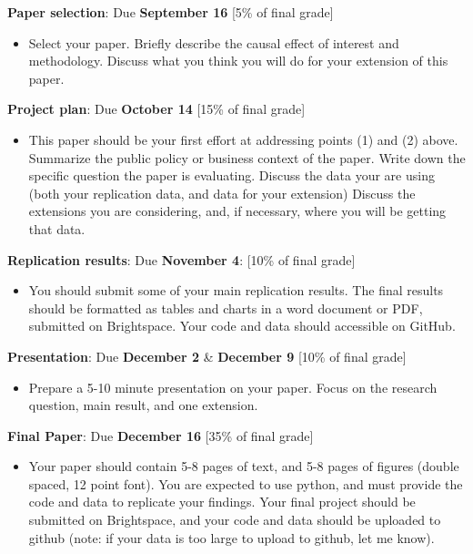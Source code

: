 \documentclass[handout, 8pt]{beamer}
\begin{document}
\begin{frame}{}

\textbf{Paper selection}: Due \textbf{September 16} [5\% of final grade]
\begin{itemize}
\item Select your paper. Briefly describe the causal effect of interest and methodology. Discuss what you think you will do for your extension of this paper. 
\end{itemize}

\textbf{Project plan}: Due \textbf{October 14} [15\% of final grade] 
\begin{itemize}
\item This paper should be your first effort at addressing points (1) and (2) above. 
Summarize the public policy or business context of the paper. 
Write down the specific question the paper is evaluating.
Discuss the data your are using (both your replication data, and data for your extension)
Discuss the extensions you are considering, and, if necessary, where you will be getting that data. 
\end{itemize} 

\textbf{Replication results}: Due \textbf{November 4}: [10\% of final grade]
\begin{itemize}
\item You should submit some of your main replication results. The final results should be formatted as tables and charts in a word document or PDF, submitted on Brightspace. Your code and data should accessible on GitHub.
\end{itemize}

\textbf{Presentation}: Due \textbf{December 2} \& \textbf{December 9} [10\% of final grade]
\begin{itemize}
\item Prepare a 5-10 minute presentation on your paper. Focus on the research question, main result, and one extension. 
\end{itemize}

\textbf{Final Paper}: Due \textbf{December 16} [35\% of final grade]
\begin{itemize}
\item Your paper should contain 5-8 pages of text, and 5-8 pages of figures (double spaced, 12 point font).
You are expected to use python, and must provide the code and data to replicate your findings. 
Your final project should be submitted on Brightspace, and your code and data should be uploaded to github (note: if your data is too large to upload to github, let me know). 
\end{itemize}

\end{frame}
\end{document}
